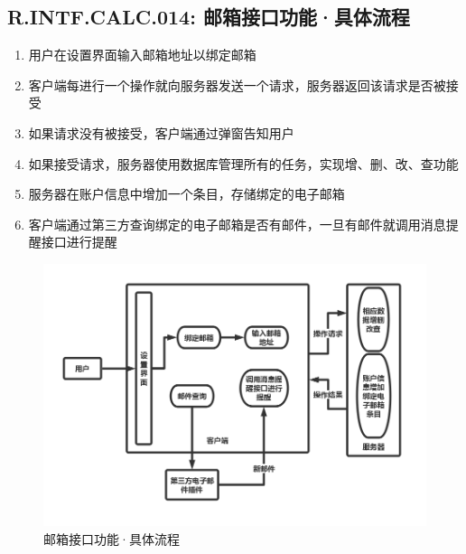     \subsection{R.INTF.CALC.014: 邮箱接口功能·具体流程}
    \begin{enumerate}
        \item 用户在设置界面输入邮箱地址以绑定邮箱
        \item 客户端每进行一个操作就向服务器发送一个请求，服务器返回该请求是否被接受
        \item 如果请求没有被接受，客户端通过弹窗告知用户
        \item 如果接受请求，服务器使用数据库管理所有的任务，实现增、删、改、查功能
        \item 服务器在账户信息中增加一个条目，存储绑定的电子邮箱
        \item 客户端通过第三方查询绑定的电子邮箱是否有邮件，一旦有邮件就调用消息提醒接口进行提醒
    \end{enumerate}
     \newpage
        \begin{figure}[h]
            \centering
            \includegraphics[scale=0.4]{OutlineDesign/figures/邮箱接口功能·具体流程.png}
            \caption{邮箱接口功能·具体流程}
            \label{fig:server_flow}
        \end{figure}
